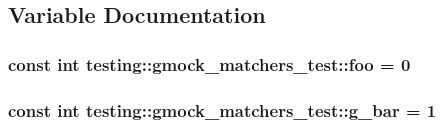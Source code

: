 \subsection{Variable Documentation}
\subsubsection[{\texorpdfstring{foo}{foo}}]{\setlength{\rightskip}{0pt plus 5cm}const int testing\+::gmock\+\_\+matchers\+\_\+test\+::foo = 0}\hypertarget{namespacetesting_1_1gmock__matchers__test_a3536e68112ffbb1f76887cd15bb45c15}{}\label{namespacetesting_1_1gmock__matchers__test_a3536e68112ffbb1f76887cd15bb45c15}
\subsubsection[{\texorpdfstring{g\+\_\+bar}{g_bar}}]{\setlength{\rightskip}{0pt plus 5cm}const int testing\+::gmock\+\_\+matchers\+\_\+test\+::g\+\_\+bar = 1}\hypertarget{namespacetesting_1_1gmock__matchers__test_a55dcc962203a3a3361d2e7e00ed99b4d}{}\label{namespacetesting_1_1gmock__matchers__test_a55dcc962203a3a3361d2e7e00ed99b4d}
